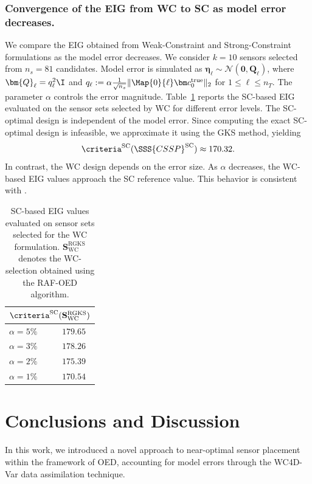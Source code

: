 \documentclass{aims} %
\theoremstyle{definition}
\begin{document}
\subsubsection*{Convergence of the EIG from WC to SC as model error decreases.}
We compare the EIG obtained from Weak-Constraint  and Strong-Constraint formulations as the model error decreases.  
We consider  $k=10$ sensors selected from $n_s=81$ candidates.  
Model error is simulated as $\bm\eta_\ell \sim \mathcal{N}(\bm 0, \bm Q_{\ell})$, where $\bm{Q}_{\ell} = q^2_\ell \I$ and 
$q_\ell := \alpha \tfrac{1}{\sqrt{n_{s}}} \| \Map{0}{\ell} \bm c^{\text{true}}_0 \|_2$ for $1 \le \ell \le n_T$.  
The parameter $\alpha$ controls the error magnitude.  
Table~\ref{tab:eig_wc_vs_sc} reports the SC-based EIG evaluated on the sensor sets selected by WC for different error levels.  
The SC-optimal design is independent of the model error. Since computing the exact SC-optimal design is infeasible, we approximate it using the GKS method, yielding
\[
\criteria^\text{SC}(\SSS{CSSP}^\text{SC}) \approx 170.32.
\]
In contrast, the WC design depends on the error size.  
As $\alpha$ decreases, the WC-based EIG values approach the SC reference value.  
This behavior is consistent with .  

\begin{table}[htbp]
\centering
\begin{tabular}{lc}
\multicolumn{2}{c}{$ \criteria^\text{SC}(\mathbf{S}^\text{RGKS}_\text{WC})$} \\
\midrule
$\alpha = 5\%$ & $179.65$ \\
$\alpha = 3\%$ & $178.26$ \\
$\alpha = 2\%$ & $175.39$ \\
$\alpha = 1\%$ & $170.54$ \\
\end{tabular}
\caption{SC-based EIG values evaluated on sensor sets selected for the WC formulation.
$\mathbf{S}^\text{RGKS}_\text{WC}$ denotes the WC-selection obtained using the RAF-OED algorithm.}
\label{tab:eig_wc_vs_sc}
\end{table}







\section{Conclusions and Discussion}  
In this work, we introduced a novel approach to near-optimal sensor placement within the framework of OED, accounting for model errors through the WC4D-Var data assimilation technique.  
\end{document}
